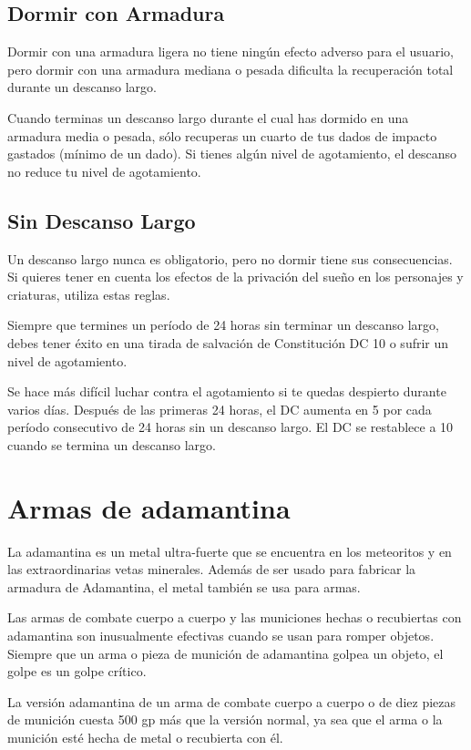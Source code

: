 \documentclass[a4paper,twocolumn,openany,10pt]{dndbook}
\begin{document}
\subsection{Dormir con Armadura}
Dormir con una armadura ligera no tiene ningún efecto adverso para el usuario, pero dormir con una armadura mediana o pesada
dificulta la recuperación total durante un descanso largo.

Cuando terminas un descanso largo durante el cual has dormido en una armadura media o pesada, sólo recuperas un cuarto de tus
dados de impacto gastados (mínimo de un dado). Si tienes algún nivel de agotamiento, el descanso no reduce tu nivel de
agotamiento.

\subsection{Sin Descanso Largo}
Un descanso largo nunca es obligatorio, pero no dormir tiene sus consecuencias. Si quieres tener en cuenta los efectos de la
privación del sueño en los personajes y criaturas, utiliza estas reglas.

Siempre que termines un período de 24 horas sin terminar un descanso largo, debes tener éxito en una tirada de salvación de
Constitución DC 10 o sufrir un nivel de agotamiento.

Se hace más difícil luchar contra el agotamiento si te quedas despierto durante varios días. Después de las primeras 24 horas, el
DC aumenta en 5 por cada período consecutivo de 24 horas sin un descanso largo. El DC se restablece a 10 cuando se termina un
descanso largo.

\section{Armas de adamantina}
La adamantina es un metal ultra-fuerte que se encuentra en los meteoritos y en las extraordinarias vetas minerales. Además de ser
usado para fabricar la armadura de Adamantina, el metal también se usa para armas.

Las armas de combate cuerpo a cuerpo y las municiones hechas o recubiertas con adamantina son inusualmente efectivas cuando se
usan para romper objetos. Siempre que un arma o pieza de munición de adamantina golpea un objeto, el golpe es un golpe crítico.

La versión adamantina de un arma de combate cuerpo a cuerpo o de diez piezas de munición cuesta 500 gp más que la versión normal,
ya sea que el arma o la munición esté hecha de metal o recubierta con él.
\end{document}
